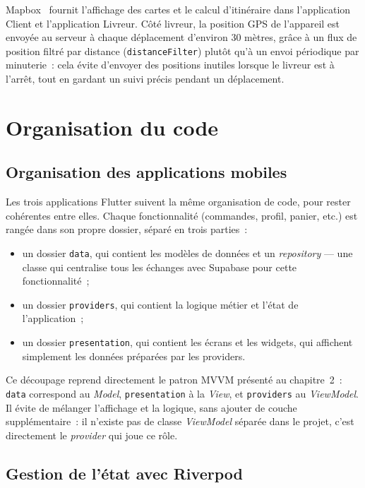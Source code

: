 \documentclass[12pt,fleqn,a4paper]{report}
\begin{document}
\begin{justify}
Mapbox~\cite{mapbox_docs} fournit l'affichage des cartes et le calcul d'itinéraire dans l'application Client et l'application Livreur. Côté livreur, la position GPS de l'appareil est envoyée au serveur à chaque déplacement d'environ 30 mètres, grâce à un flux de position filtré par distance (\texttt{distanceFilter}) plutôt qu'à un envoi périodique par minuterie~: cela évite d'envoyer des positions inutiles lorsque le livreur est à l'arrêt, tout en gardant un suivi précis pendant un déplacement.

\section{Organisation du code}

\subsection{Organisation des applications mobiles}

Les trois applications Flutter suivent la même organisation de code, pour rester cohérentes entre elles. Chaque fonctionnalité (commandes, profil, panier, etc.) est rangée dans son propre dossier, séparé en trois parties~:

\begin{itemize}
    \item un dossier \texttt{data}, qui contient les modèles de données et un \emph{repository} — une classe qui centralise tous les échanges avec Supabase pour cette fonctionnalité~;
    \item un dossier \texttt{providers}, qui contient la logique métier et l'état de l'application~;
    \item un dossier \texttt{presentation}, qui contient les écrans et les widgets, qui affichent simplement les données préparées par les providers.
\end{itemize}

Ce découpage reprend directement le patron MVVM présenté au chapitre~2~: \texttt{data} correspond au \textit{Model}, \texttt{presentation} à la \textit{View}, et \texttt{providers} au \textit{ViewModel}. Il évite de mélanger l'affichage et la logique, sans ajouter de couche supplémentaire~: il n'existe pas de classe \textit{ViewModel} séparée dans le projet, c'est directement le \textit{provider} qui joue ce rôle.

\subsection{Gestion de l'état avec Riverpod}


\end{justify}
\end{document}
